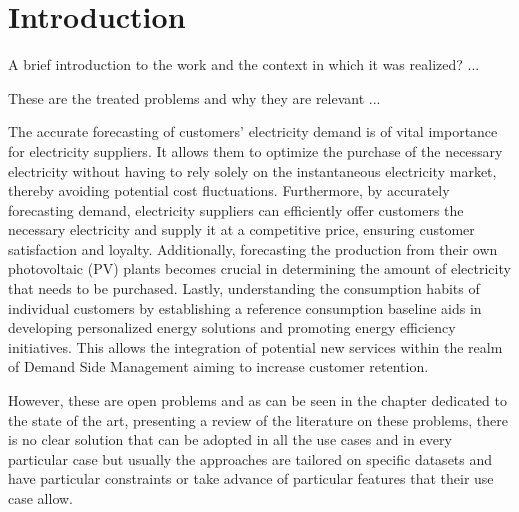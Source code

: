 \chapter{Introduction}
\label{cha:intro}
\vspace{0.4 cm}

A brief introduction to the work and the context in which it was realized? ...


These are the treated problems and why they are relevant ...

The accurate forecasting of customers' electricity demand is of vital importance for electricity suppliers.
It allows them to optimize the purchase of the necessary electricity without having to rely solely on the instantaneous electricity market, thereby avoiding potential cost fluctuations.
Furthermore, by accurately forecasting demand, electricity suppliers can efficiently offer customers the necessary electricity and supply it at a competitive price, ensuring customer satisfaction and loyalty.
Additionally, forecasting the production from their own photovoltaic (PV) plants becomes crucial in determining the amount of electricity that needs to be purchased.
Lastly, understanding the consumption habits of individual customers by establishing a reference consumption baseline aids in developing personalized energy solutions and promoting energy efficiency initiatives.
This allows the integration of potential new services within the realm of Demand Side Management aiming to increase customer retention.

However, these are open problems and as can be seen in the chapter dedicated to the state of the art, presenting a review of the literature on these problems, there is no clear solution that can be adopted in all the use cases and in every particular case but usually the approaches are tailored on specific datasets and have particular constraints or take advance of particular features that their use case allow.



